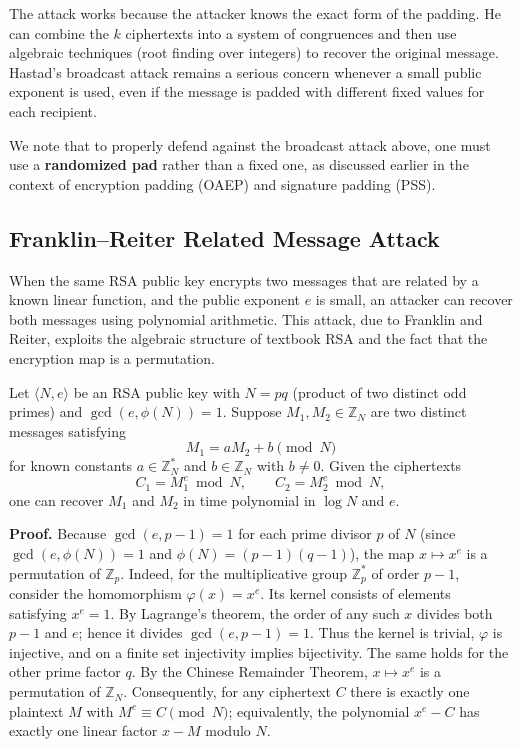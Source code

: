 The attack works because the attacker knows the exact form of the padding. He can combine the \(k\) ciphertexts into a system of congruences and then use algebraic techniques (root finding over integers) to recover the original message. Hastad's broadcast attack remains a serious concern whenever a small public exponent is used, even if the message is padded with different fixed values for each recipient.

We note that to properly defend against the broadcast attack above, one must use a \textbf{randomized pad} rather than a fixed one, as discussed earlier in the context of encryption padding (OAEP) and signature padding (PSS).


\subsection{Franklin--Reiter Related Message Attack}

When the same RSA public key encrypts two messages that are related by a known linear function, and the public exponent \(e\) is small, an attacker can recover both messages using polynomial arithmetic. This attack, due to Franklin and Reiter, exploits the algebraic structure of textbook RSA and the fact that the encryption map is a permutation.

Let \(\langle N, e \rangle\) be an RSA public key with \(N = pq\) (product of two distinct odd primes) and \(\gcd(e, \phi(N)) = 1\). Suppose \(M_1, M_2 \in \mathbb{Z}_N\) are two distinct messages satisfying
\[
M_1 = a M_2 + b \pmod N
\]
for known constants \(a \in \mathbb{Z}_N^*\) and \(b \in \mathbb{Z}_N\) with \(b \neq 0\). Given the ciphertexts
\[
C_1 = M_1^e \bmod N,\qquad C_2 = M_2^e \bmod N,
\]
one can recover \(M_1\) and \(M_2\) in time polynomial in \(\log N\) and \(e\).

\textbf{Proof.}
Because \(\gcd(e, p-1) = 1\) for each prime divisor \(p\) of \(N\) (since \(\gcd(e, \phi(N)) = 1\) and \(\phi(N) = (p-1)(q-1)\)), the map \(x \mapsto x^e\) is a permutation of \(\mathbb{Z}_p\). Indeed, for the multiplicative group \(\mathbb{Z}_p^*\) of order \(p-1\), consider the homomorphism \(\varphi(x) = x^e\). Its kernel consists of elements satisfying \(x^e = 1\). By Lagrange's theorem, the order of any such \(x\) divides both \(p-1\) and \(e\); hence it divides \(\gcd(e, p-1) = 1\). Thus the kernel is trivial, \(\varphi\) is injective, and on a finite set injectivity implies bijectivity. The same holds for the other prime factor \(q\). By the Chinese Remainder Theorem, \(x \mapsto x^e\) is a permutation of \(\mathbb{Z}_N\). Consequently, for any ciphertext \(C\) there is exactly one plaintext \(M\) with \(M^e \equiv C \pmod N\); equivalently, the polynomial \(x^e - C\) has exactly one linear factor \(x - M\) modulo \(N\).

